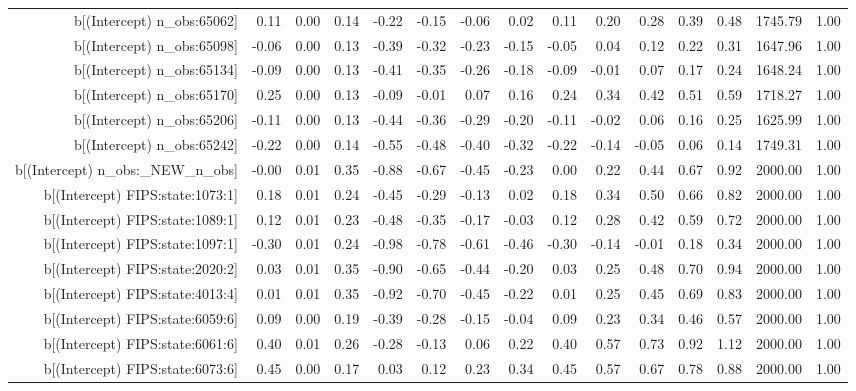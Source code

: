 \begin{table}[ht]
\begin{tabular}{rrrrrrrrrrrrrrr}
  b[(Intercept) n\_obs:65062] & 0.11 & 0.00 & 0.14 & -0.22 & -0.15 & -0.06 & 0.02 & 0.11 & 0.20 & 0.28 & 0.39 & 0.48 & 1745.79 & 1.00 \\ 
  b[(Intercept) n\_obs:65098] & -0.06 & 0.00 & 0.13 & -0.39 & -0.32 & -0.23 & -0.15 & -0.05 & 0.04 & 0.12 & 0.22 & 0.31 & 1647.96 & 1.00 \\ 
  b[(Intercept) n\_obs:65134] & -0.09 & 0.00 & 0.13 & -0.41 & -0.35 & -0.26 & -0.18 & -0.09 & -0.01 & 0.07 & 0.17 & 0.24 & 1648.24 & 1.00 \\ 
  b[(Intercept) n\_obs:65170] & 0.25 & 0.00 & 0.13 & -0.09 & -0.01 & 0.07 & 0.16 & 0.24 & 0.34 & 0.42 & 0.51 & 0.59 & 1718.27 & 1.00 \\ 
  b[(Intercept) n\_obs:65206] & -0.11 & 0.00 & 0.13 & -0.44 & -0.36 & -0.29 & -0.20 & -0.11 & -0.02 & 0.06 & 0.16 & 0.25 & 1625.99 & 1.00 \\ 
  b[(Intercept) n\_obs:65242] & -0.22 & 0.00 & 0.14 & -0.55 & -0.48 & -0.40 & -0.32 & -0.22 & -0.14 & -0.05 & 0.06 & 0.14 & 1749.31 & 1.00 \\ 
  b[(Intercept) n\_obs:\_NEW\_n\_obs] & -0.00 & 0.01 & 0.35 & -0.88 & -0.67 & -0.45 & -0.23 & 0.00 & 0.22 & 0.44 & 0.67 & 0.92 & 2000.00 & 1.00 \\ 
  b[(Intercept) FIPS:state:1073:1] & 0.18 & 0.01 & 0.24 & -0.45 & -0.29 & -0.13 & 0.02 & 0.18 & 0.34 & 0.50 & 0.66 & 0.82 & 2000.00 & 1.00 \\ 
  b[(Intercept) FIPS:state:1089:1] & 0.12 & 0.01 & 0.23 & -0.48 & -0.35 & -0.17 & -0.03 & 0.12 & 0.28 & 0.42 & 0.59 & 0.72 & 2000.00 & 1.00 \\ 
  b[(Intercept) FIPS:state:1097:1] & -0.30 & 0.01 & 0.24 & -0.98 & -0.78 & -0.61 & -0.46 & -0.30 & -0.14 & -0.01 & 0.18 & 0.34 & 2000.00 & 1.00 \\ 
  b[(Intercept) FIPS:state:2020:2] & 0.03 & 0.01 & 0.35 & -0.90 & -0.65 & -0.44 & -0.20 & 0.03 & 0.25 & 0.48 & 0.70 & 0.94 & 2000.00 & 1.00 \\ 
  b[(Intercept) FIPS:state:4013:4] & 0.01 & 0.01 & 0.35 & -0.92 & -0.70 & -0.45 & -0.22 & 0.01 & 0.25 & 0.45 & 0.69 & 0.83 & 2000.00 & 1.00 \\ 
  b[(Intercept) FIPS:state:6059:6] & 0.09 & 0.00 & 0.19 & -0.39 & -0.28 & -0.15 & -0.04 & 0.09 & 0.23 & 0.34 & 0.46 & 0.57 & 2000.00 & 1.00 \\ 
  b[(Intercept) FIPS:state:6061:6] & 0.40 & 0.01 & 0.26 & -0.28 & -0.13 & 0.06 & 0.22 & 0.40 & 0.57 & 0.73 & 0.92 & 1.12 & 2000.00 & 1.00 \\ 
  b[(Intercept) FIPS:state:6073:6] & 0.45 & 0.00 & 0.17 & 0.03 & 0.12 & 0.23 & 0.34 & 0.45 & 0.57 & 0.67 & 0.78 & 0.88 & 2000.00 & 1.00 \\ 

\end{tabular}
\end{table}
